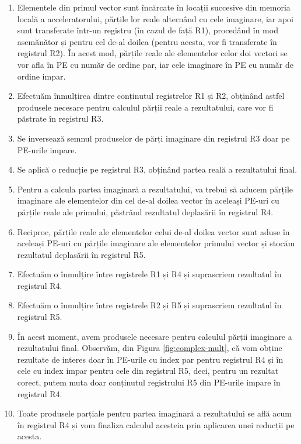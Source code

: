 \begin{enumerate}
\item Elementele din primul vector sunt încărcate în
locații succesive din memoria locală a acceleratorului, părțile lor reale
alternând cu cele imaginare, iar apoi sunt transferate într-un registru (în
cazul de față R1), procedând în mod asemănător și pentru cel de-al doilea
(pentru acesta, vor fi transferate în registrul R2). În acest mod, părțile reale ale elementelor celor
doi vectori se vor afla în PE cu număr de ordine par, iar cele imaginare în PE
cu număr de ordine impar.

\item Efectuăm înmulțirea dintre conținutul registrelor R1 și R2, obținând
astfel produsele necesare pentru calculul părții reale a rezultatului, care
vor fi păstrate în registrul R3. 

\item Se inversează semnul produselor de părți imaginare din registrul R3 doar
pe PE-urile impare.

\item Se aplică o reducție pe registrul R3, obținând partea reală a
rezultatului final.

\item Pentru a calcula partea imaginară a rezultatului, va trebui să aducem
părțile imaginare ale elementelor din cel de-al doilea vector în aceleași PE-uri
cu părțile reale ale primului, păstrând rezultatul deplasării în registrul R4.

\item Reciproc, părțile reale ale elementelor celui de-al doilea vector sunt
aduse în aceleași PE-uri cu părțile imaginare ale elementelor primului vector și
stocăm rezultatul deplasării în registrul R5.

\item Efectuăm o înmulțire între registrele R1 și R4 și suprascriem rezultatul
în registrul R4.

\item Efectuăm o înmulțire între registrele R2 și R5 și suprascriem rezultatul
în registrul R5.

\item În acest moment, avem produsele necesare pentru calculul părții imaginare a
rezultatului final. Observăm, din Figura \ref{fig:complex-mult}, că vom obține
rezultate de interes doar în PE-urile cu index par pentru registrul R4 și în
cele cu index impar pentru cele din registrul R5, deci, pentru un rezultat
corect, putem muta doar conținutul registrului R5 din PE-urile impare în
registrul R4.

\item Toate produsele parțiale pentru partea imaginară a rezultatului se află
acum în registrul R4 și vom finaliza calculul acesteia prin aplicarea unei
reducții pe acesta.
\end{enumerate}

